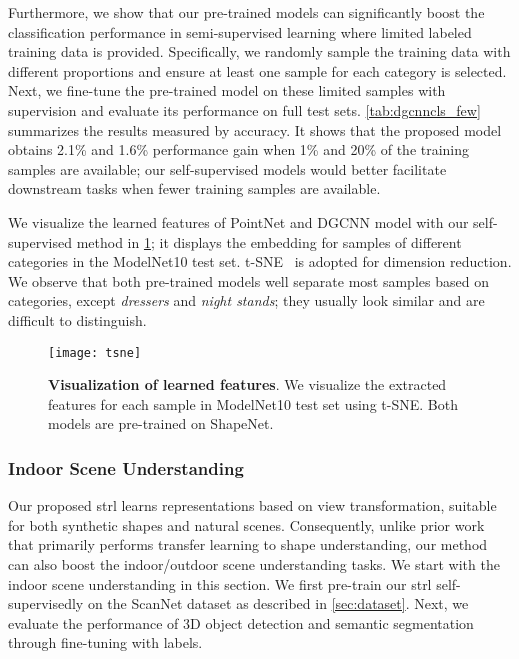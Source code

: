 \documentclass[10pt,twocolumn,letterpaper]{article}
\makeatletter
\renewcommand{\paragraph}{\@startsection{paragraph}{4}{\z@}{0ex \@plus 0ex \@minus 0ex}{-1em}{\hskip\parindent\normalfont\normalsize\bfseries}}
\makeatother
\begin{document}
Furthermore, we show that our pre-trained models can significantly boost the classification performance in semi-supervised learning where limited labeled training data is provided. Specifically, we randomly sample the training data with different proportions and ensure at least one sample for each category is selected. Next, we fine-tune the pre-trained model on these limited samples with supervision and evaluate its performance on full test sets. \cref{tab:dgcnncls_few} summarizes the results measured by accuracy. It shows that the proposed model obtains 2.1\% and 1.6\% performance gain when 1\% and 20\% of the training samples are available; our self-supervised models would better facilitate downstream tasks when fewer training samples are available.


\paragraph{Embedding Visualization}

We visualize the learned features of PointNet and DGCNN model with our self-supervised method in \cref{fig:emb_vis}; it displays the embedding for samples of different categories in the ModelNet10 test set. t-SNE~\cite{maaten2008visualizing} is adopted for dimension reduction. We observe that both pre-trained models well separate most samples based on categories, except \emph{dressers} and \emph{night stands}; they usually look similar and are difficult to distinguish.

\begin{figure}[t!]
    \centering
    \texttt{[image: tsne]}
    \caption{\textbf{Visualization of learned features}. We visualize the extracted features for each sample in ModelNet10 test set using t-SNE. Both models are pre-trained on ShapeNet.}
    \label{fig:emb_vis}
\end{figure}

\subsubsection{Indoor Scene Understanding}\label{sec:indoor}

Our proposed \ac{strl} learns representations based on view transformation, suitable for both synthetic shapes and natural scenes. Consequently, unlike prior work that primarily performs transfer learning to shape understanding, our method can also boost the indoor/outdoor scene understanding tasks. We start with the indoor scene understanding in this section. We first pre-train our \ac{strl} self-supervisedly on the ScanNet dataset as described in \cref{sec:dataset}. Next, we evaluate the performance of 3D object detection and semantic segmentation through fine-tuning with labels.
\end{document}
